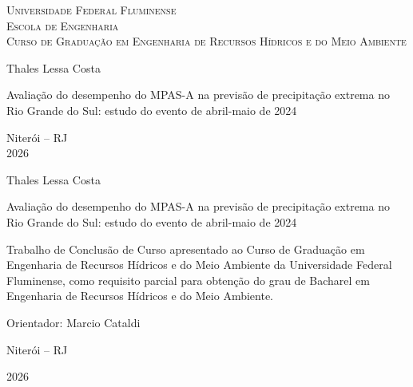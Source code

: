 \documentclass[12pt,a4paper,oneside]{book}
\begin{document}
\begin{titlepage}
\begin{center}
\Large{\textsc{Universidade Federal Fluminense}\\
\textsc{Escola de Engenharia}\\
\textsc{Curso de Graduação em Engenharia de Recursos Hídricos e do Meio Ambiente}}
\par\vfill
\LARGE{Thales Lessa Costa}
\par\vfill
\LARGE{Avaliação do desempenho do MPAS-A na previsão de precipitação extrema no Rio Grande do Sul: estudo do evento de abril-maio de 2024}
\par\vfill
\Large{Niterói -- RJ\\
2026}
\end{center}
\end{titlepage}

\begin{center}
Thales Lessa Costa

\vfill

Avaliação do desempenho do MPAS-A na previsão de precipitação extrema no Rio Grande do Sul: estudo do evento de abril-maio de 2024

\vspace{3cm}

\begin{flushright}
\begin{minipage}{0.55\textwidth}
Trabalho de Conclusão de Curso apresentado ao Curso de Graduação em Engenharia de Recursos Hídricos e do Meio Ambiente da Universidade Federal Fluminense, como requisito parcial para obtenção do grau de Bacharel em Engenharia de Recursos Hídricos e do Meio Ambiente.
\end{minipage}
\end{flushright}

\vspace{3cm}

Orientador: Marcio Cataldi


\vfill

Niterói -- RJ

2026
\end{center}
\pagebreak

\setcounter{page}{2}

\vspace*{\fill}
\begin{center}
\end{center}
\vspace*{\fill}
\clearpage
\end{document}
